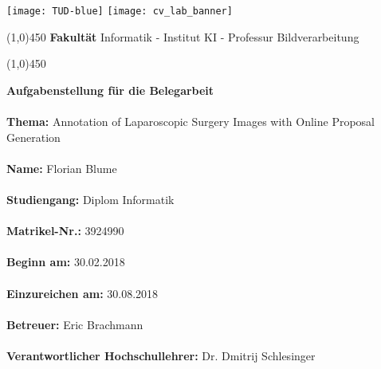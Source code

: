 
\begin{center}
\texttt{[image: TUD-blue]}
\hfill
\texttt{[image: cv\_lab\_banner]}
\end{center}

\vspace{10mm}

\line(1,0){450}
\vspace{1mm}
\textbf{Fakult\"at} Informatik - Institut KI - Professur Bildverarbeitung

\vspace{1mm}
\line(1,0){450}

\vspace{10mm}

\noindent \Large \textbf{Aufgabenstellung f\"ur die Belegarbeit} \normalsize
\\\\

\noindent \textbf{Thema:} Annotation of Laparoscopic Surgery Images with Online Proposal Generation \\ \\
\textbf{Name:} Florian Blume \\ \\
\textbf{Studiengang:} Diplom Informatik \\ \\
\textbf{Matrikel-Nr.:} 3924990 \\ \\
\textbf{Beginn am:} 30.02.2018 \\ \\
\textbf{Einzureichen am:} 30.08.2018 \\ \\
\textbf{Betreuer:} Eric Brachmann \\ \\
\textbf{Verantwortlicher Hochschullehrer:} 
Dr. Dmitrij Schlesinger \\ \\

